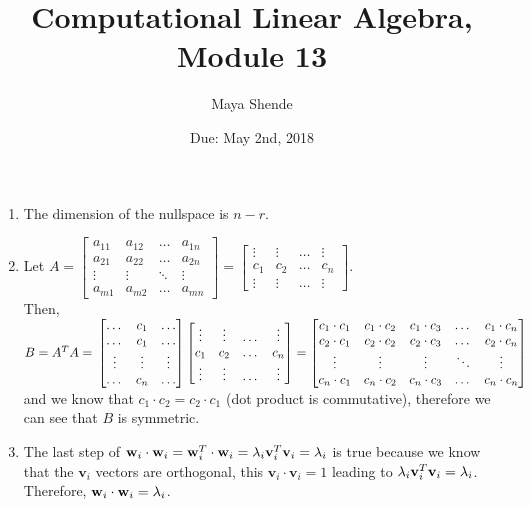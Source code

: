 \documentclass{article}
\title{Computational Linear Algebra, Module 13}
\author{Maya Shende}
\date{Due: May 2nd, 2018}
\begin{document}
\maketitle

\begin{enumerate}
\item The dimension of the nullspace is $n-r$. 

\item Let $A = 
\begin{bmatrix}
a_{11}	&a_{12}	&\dots	&a_{1n}\\
a_{21}	&a_{22}	&\dots	&a_{2n}\\
\vdots	&\vdots	&\ddots	&\vdots\\
a_{m1}	&a_{m2}	&\dots	&a_{mn}
\end{bmatrix}
= 
\begin{bmatrix}
\vdots	&\vdots	&\dots	&\vdots\\
c_1		&c_2		&\dots	&c_n\\
\vdots	&\vdots	&\dots	&\vdots
\end{bmatrix}
$. \\Then, $B = A^TA = \\
\begin{bmatrix}
\dots		&c_1		&\dots\\
\dots		&c_1		&\dots\\
\vdots	&\vdots	&\vdots\\
\dots		&c_n		&\dots
\end{bmatrix}
\begin{bmatrix}
\vdots	&\vdots	&\dots	&\vdots\\
c_1		&c_2		&\dots	&c_n\\
\vdots	&\vdots	&\dots	&\vdots
\end{bmatrix}
= 
\begin{bmatrix}
c_1\cdot c_1	&c_1\cdot c_2	&c_1\cdot c_3	&\dots	&c_1\cdot c_n\\
c_2\cdot c_1	&c_2\cdot c_2	&c_2\cdot c_3	&\dots	&c_2\cdot c_n\\
\vdots		&\vdots		&\vdots		&\ddots	&\vdots\\
c_n\cdot c_1	&c_n\cdot c_2	&c_n\cdot c_3	&\dots	&c_n\cdot c_n
\end{bmatrix}
$ and we know that $c_1\cdot c_2 = c_2\cdot c_1$ (dot product is commutative), therefore we can see that $B$ is symmetric. 

\item The last step of ${\bf w}_i \cdot {\bf w}_i	= {\bf w}_i^T \cdot {\bf w}_i = \lambda_i {\bf v}_i^T {\bf v}_i = \lambda_i $ is true because we know that the $\textbf{v}_i$ vectors are orthogonal, this $\textbf{v}_i \cdot \textbf{v}_i = 1$ leading to $\lambda_i {\bf v}_i^T {\bf v}_i = \lambda_i$. Therefore, ${\bf w}_i \cdot {\bf w}_i = \lambda_i$.


\end{enumerate}
\end{document}
